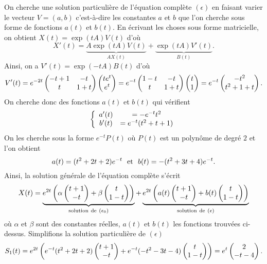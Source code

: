 \documentclass[class=report,crop=false]{standalone}
\begin{document}
\begin{exemple}
On cherche une solution particulière de l'équation complète $(\epsilon)$ en faisant varier le vecteur $V=(a,b)$ c'est-à-dire les constantes $a$ et $b$ que l'on cherche sous forme de fonctions $a(t)$ et $b(t)$. En écrivant les choses sous forme matricielle, on obtient $X(t)=\exp(tA)V(t)$ d'où
$$X'(t)=\underbrace{A\exp(tA)V(t)}_{AX(t)}+\underbrace{\exp(tA)V'(t)}_{B(t)}.$$
Ainsi, on a $V'(t)=\exp(-tA)B(t)$ d'où
$$V'(t)=e^{-2t}\left(\begin{matrix}-t+1&-t\cr t&1+t\end{matrix}\right)\left(\begin{matrix}te^t\cr e^t\end{matrix}\right)
=e^{-t}\left(\begin{matrix}1-t&-t\cr t&1+t\end{matrix}\right)\left(\begin{matrix}t\cr 1\end{matrix}\right)
=e^{-t}\left(\begin{matrix}-t^2\cr t^2+1+t\end{matrix}\right).$$
On cherche donc des fonctions $a(t)$ et $b(t)$ qui vérifient
$$\left\{\begin{array}{cc}a'(t)&=-e^{-t}t^2\cr b'(t)&=e^{-t}(t^2+t+1)\end{array}\right.$$
On les cherche sous la forme $e^{-t}P(t)$ où $P(t)$ est un polynôme de degré $2$ et l'on obtient 
$$a(t)=(t^2+2t+2)e^{-t}\ \ {\hbox{et}}\ \ b(t)=-(t^2+3t+4)e^{-t}.$$ 
Ainsi, la solution générale de l'équation complète s'écrit 
$$X(t)=\underbrace{e^{2t}\left(\alpha\left(\begin{matrix}t+1\cr -t\end{matrix}\right)+\beta\left(\begin{matrix}t\cr 1-t\end{matrix}\right)\right)}_{\rm solution\ de\ (\epsilon_0)}
+\underbrace{e^{2t}\left(a(t)\left(\begin{matrix}t+1\cr -t\end{matrix}\right)+b(t)\left(\begin{matrix}t\cr 1-t\end{matrix}\right)\right)}_{\rm solution\ de\ (\epsilon)}$$
où $\alpha$ et $\beta$ sont des constantes réelles, $a(t)$ et $b(t)$ les fonctions trouvées ci-dessus.
Simplifions la solution particulière de $(\epsilon)$
$$S_1(t)=e^{2t}\left(e^{-t}(t^2+2t+2)\left(\begin{matrix}t+1\cr -t\end{matrix}\right)+
e^{-t}(-t^2-3t-4)\left(\begin{matrix}t\cr 1-t\end{matrix}\right)\right)=e^t\left(\begin{matrix}2\cr -t-4\end{matrix}\right).$$

\end{exemple}
\end{document}
